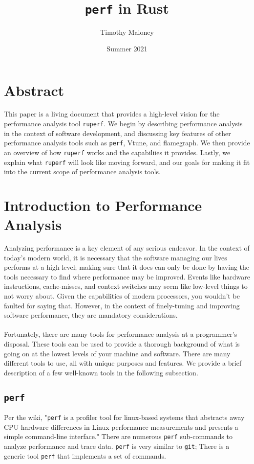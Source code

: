 \documentclass{article}
\title{\texttt{perf} in Rust}
\author{Timothy Maloney}
\date{Summer 2021}
\begin{document}
\maketitle
\section*{Abstract}
This paper is a living document that provides a high-level vision for the performance analysis tool \texttt{ruperf}.
We begin by describing performance analysis in the context of software development, and discussing key features of other 
performance analysis tools such as \texttt{perf}, Vtune, and flamegraph. We then provide an overview of how \texttt{ruperf} works
and the capabiliies it provides. Lastly, we explain what \texttt{ruperf} will look like moving forward, and our goals for making it 
fit into the current scope of performance analysis tools.
\pagebreak
\section{Introduction to Performance Analysis}
Analyzing performance is a key element of any serious endeavor. In the context of today's modern world, it is necessary
that the software managing our lives performs at a high level; making sure that it does can only be done by having the tools
necessary to find where performance may be improved. Events like hardware instructions, cache-misses,
and context switches may seem like low-level things to not worry about. Given the capabilities of modern processors, you wouldn't be
faulted for saying that. However, in the context of finely-tuning and improving software performance, they are mandatory considerations.
\\\\
Fortunately, there are many tools for performance analysis at a programmer's disposal. These tools can be used to provide a
thorough background of what is going on at the lowest levels of your machine and software. There are many different tools to use, all with
unique purposes and features. We provide a brief description of a few well-known tools in the following subsection.
\subsection{\texttt{perf}}
Per the wiki, "\texttt{perf} is a profiler tool for linux-based systems that abstracts away CPU hardware differences in Linux performance measurements and presents a simple command-line interface." There are numerous \texttt{perf} sub-commands to analyze performance and trace data. \texttt{perf} is very similar to \texttt{git}; There is a generic tool \texttt{perf} that
implements a set of commands.
\end{document}
